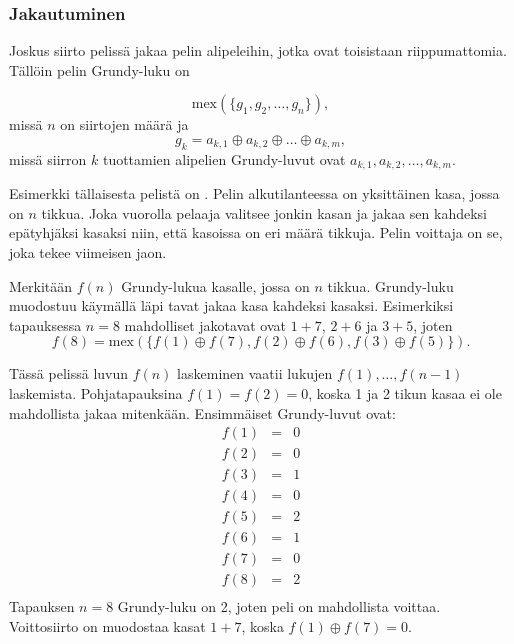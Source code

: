 \subsubsection{Jakautuminen}

Joskus siirto pelissä jakaa pelin alipeleihin,
jotka ovat toisistaan riippumattomia.
Tällöin pelin Grundy-luku on

\[\textrm{mex}(\{g_1, g_2, \ldots, g_n \}),\]
missä $n$ on siirtojen määrä ja
\[g_k = a_{k,1} \oplus a_{k,2} \oplus \ldots \oplus a_{k,m},\]
missä siirron $k$ tuottamien alipelien
Grundy-luvut ovat $a_{k,1},a_{k,2},\ldots,a_{k,m}$.


Esimerkki tällaisesta pelistä on .
Pelin alkutilanteessa on yksittäinen kasa, jossa on $n$ tikkua.
Joka vuorolla pelaaja valitsee jonkin kasan
ja jakaa sen kahdeksi epätyhjäksi kasaksi
niin, että kasoissa on eri määrä tikkuja.
Pelin voittaja on se, joka tekee viimeisen jaon.

Merkitään $f(n)$ Grundy-lukua kasalle,
jossa on $n$ tikkua.
Grundy-luku muodostuu käymällä läpi tavat
jakaa kasa kahdeksi kasaksi.
Esimerkiksi tapauksessa $n=8$ mahdolliset jakotavat
ovat $1+7$, $2+6$ ja $3+5$, joten
\[f(8)=\textrm{mex}(\{f(1) \oplus f(7), f(2) \oplus f(6), f(3) \oplus f(5)\}).\]

Tässä pelissä luvun $f(n)$ laskeminen vaatii lukujen
$f(1),\ldots,f(n-1)$ laskemista.
Pohjatapauksina $f(1)=f(2)=0$, koska 1 ja 2 tikun
kasaa ei ole mahdollista jakaa mitenkään.
Ensimmäiset Grundy-luvut ovat:
\[
\begin{array}{lcl}
f(1) & = & 0 \\
f(2) & = & 0 \\
f(3) & = & 1 \\
f(4) & = & 0 \\
f(5) & = & 2 \\
f(6) & = & 1 \\
f(7) & = & 0 \\
f(8) & = & 2 \\
\end{array}
\]
Tapauksen $n=8$ Grundy-luku on 2, joten peli on mahdollista
voittaa.
Voittosiirto on muodostaa kasat $1+7$,
koska $f(1) \oplus f(7) = 0$.

